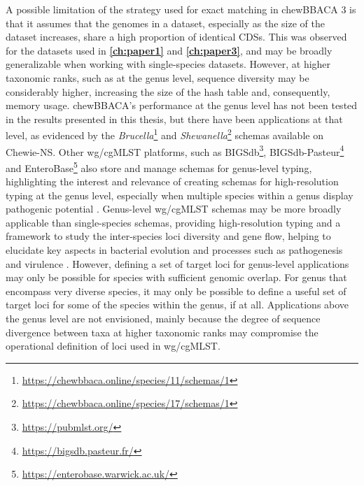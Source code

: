 A possible limitation of the strategy used for exact matching in chewBBACA 3 is that it assumes that the genomes in a dataset, especially as the size of the dataset increases, share a high proportion of identical \ac{CDSs}. This was observed for the datasets used in \textbf{\autoref{ch:paper1}} and \textbf{\autoref{ch:paper3}}, and may be broadly generalizable when working with single-species datasets. However, at higher taxonomic ranks, such as at the genus level, sequence diversity may be considerably higher, increasing the size of the hash table and, consequently, memory usage. chewBBACA's performance at the genus level has not been tested in the results presented in this thesis, but there have been applications at that level, as evidenced by the \textit{Brucella}\footnote{\url{https://chewbbaca.online/species/11/schemas/1}} \cite{abdel-glil_core_2022} and \textit{Shewanella}\footnote{\url{https://chewbbaca.online/species/17/schemas/1}} schemas available on \ac{Chewie-NS}. Other \ac{wg/cgMLST} platforms, such as \ac{BIGSdb}\footnote{\url{https://pubmlst.org/}}, BIGSdb-Pasteur\footnote{\url{https://bigsdb.pasteur.fr/}} and EnteroBase\footnote{\url{https://enterobase.warwick.ac.uk/}} also store and manage schemas for genus-level typing, highlighting the interest and relevance of creating schemas for high-resolution typing at the genus level, especially when multiple species within a genus display pathogenic potential \cite{abdel-glil_core_2022, guglielmini_genus-wide_2019, pearce_proposed_2020, savin_genus-wide_2019}. Genus-level \ac{wg/cgMLST} schemas may be more broadly applicable than single-species schemas, providing high-resolution typing and a framework to study the inter-species loci diversity and gene flow, helping to elucidate key aspects in bacterial evolution and processes such as pathogenesis and virulence \cite{xie_inter-species_2024, dabernig-heinz_core_2024}. However, defining a set of target loci for genus-level applications may only be possible for species with sufficient genomic overlap. For genus that encompass very diverse species, it may only be possible to define a useful set of target loci for some of the species within the genus, if at all. Applications above the genus level are not envisioned, mainly because the degree of sequence divergence between taxa at higher taxonomic ranks may compromise the operational definition of loci used in \ac{wg/cgMLST}.

